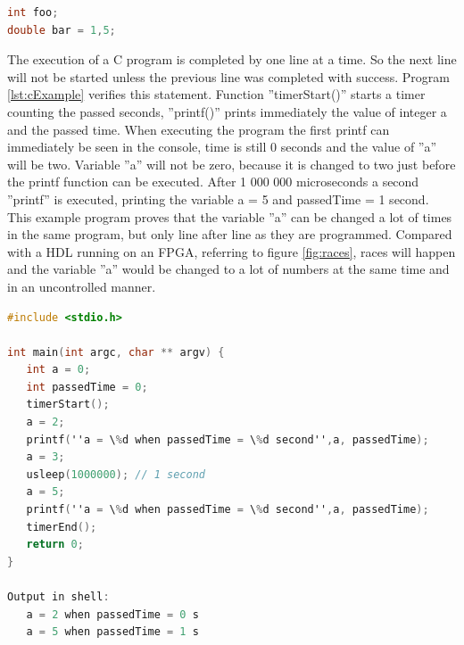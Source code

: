 \documentclass[12pt,a4paper,english,twoside,openright]{tutthesis}
\begin{document}
\begin{lstlisting}[caption={Integer declaration and initialisation},label={lst:decIni},language=C]
int foo;
double bar = 1,5;
\end{lstlisting}
The execution of a C program is completed by one line at a time. So the next line will not be started unless the previous line was completed with success. Program \ref{lst:cExample} verifies this statement. Function ''timerStart()'' starts a timer counting the passed seconds, ''printf()'' prints immediately the value of integer a and the passed time. When executing the program the first printf can immediately be seen in the console, time is still 0 seconds and the value of ''a'' will be two. Variable ''a'' will not be zero, because it is changed to two just before the printf function can be executed. After 1 000 000 microseconds a second ''printf'' is executed, printing the variable a = 5 and passedTime = 1 second. This example program proves that the variable ''a'' can be changed a lot of times in the same program, but only line after line as they are programmed. Compared with a HDL running on an FPGA, referring to figure \ref{fig:races}, races will happen and the variable ''a'' would be changed to a lot of numbers at the same time and in an uncontrolled manner.
\begin{lstlisting}[caption={C example program to verify the ''one line executes at a time'' statement},label={lst:cExample},language=C, float=h]
#include <stdio.h>

int main(int argc, char ** argv) {
   int a = 0;
   int passedTime = 0;
   timerStart();
   a = 2;
   printf(''a = \%d when passedTime = \%d second'',a, passedTime);
   a = 3;
   usleep(1000000); // 1 second
   a = 5;
   printf(''a = \%d when passedTime = \%d second'',a, passedTime);
   timerEnd();
   return 0;
}

Output in shell:
   a = 2 when passedTime = 0 s
   a = 5 when passedTime = 1 s
\end{lstlisting}
\end{document}
